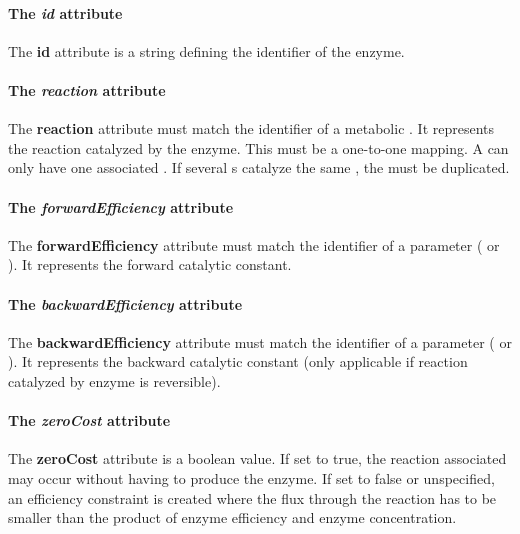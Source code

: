 \paragraph{The \textit{id} attribute}
The \textbf{id} attribute is a string defining the identifier of
the enzyme.

\paragraph{The \textit{reaction} attribute}
The \textbf{reaction} attribute must match the identifier of a metabolic
\reaction.
It represents the reaction catalyzed by the enzyme.
This must be a one-to-one mapping.
A \reaction{} can only have one associated \enzyme{}.
If several \enzyme{}s catalyze the same \reaction{},
the \reaction{} must be duplicated.

\paragraph{The \textit{forwardEfficiency} attribute}
The \textbf{forwardEfficiency} attribute must match the identifier of a
parameter (\function{} or \aggregate{}).
It represents the forward catalytic constant.

\paragraph{The \textit{backwardEfficiency} attribute}
The \textbf{backwardEfficiency} attribute must match the identifier of a
parameter (\function{} or \aggregate{}).
It represents the backward catalytic constant
(only applicable if reaction catalyzed by enzyme is reversible).

\paragraph{The \textit{zeroCost} attribute}
The \textbf{zeroCost} attribute is a boolean value.
If set to true, the reaction associated may occur without having to produce
the enzyme.
If set to false or unspecified, an efficiency constraint is created where the
flux through the reaction has to be smaller than the product of enzyme
efficiency and enzyme concentration.

